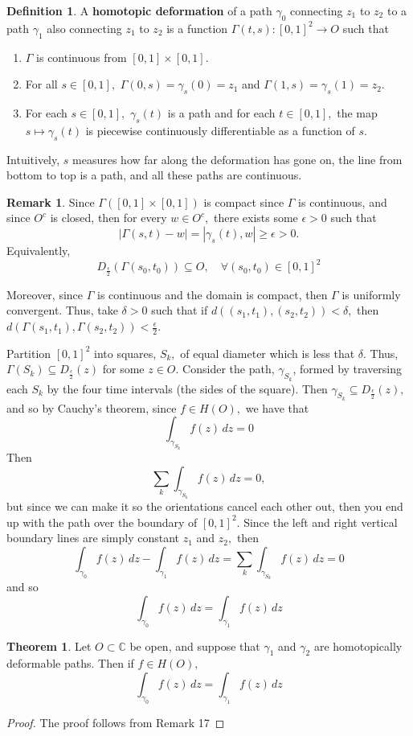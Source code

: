 \documentclass[10pt, oneside]{article}
\newcommand{\bbC}{\mathbb{C}}
\theoremstyle{definition}
\newtheorem{thm}{Theorem}
\newtheorem{defn}{Definition}
\newtheorem{rem}{Remark}
\begin{document}
\begin{defn}
    A \textbf{homotopic deformation} of a path $\gamma_0$ connecting $z_1$ to $z_2$ to a path $\gamma_1$ also connecting $z_1$ to $z_2$ is a function $\Gamma(t,s): [0,1]^2 \to O$ such that     \begin{enumerate}
        \item $\Gamma$ is continuous from $[0,1]\times [0,1].$
        \item For all $s\in [0,1],$ $\Gamma(0,s) = \gamma_s(0) = z_1$ and $\Gamma(1,s) = \gamma_s(1) = z_2.$
        \item For each $s\in [0,1],$ $\gamma_s(t)$ is a path and for each $t\in [0,1],$ the map $s\mapsto \gamma_s(t)$ is piecewise continuously differentiable as a function of $s.$
    \end{enumerate}
\end{defn}
Intuitively, $s$ measures how far along the deformation has gone on, the line from bottom to top is a path, and all these paths are continuous. 
\begin{rem}
    Since $\Gamma([0,1]\times [0,1])$ is compact since $\Gamma$ is continuous, and since $O^c$ is closed, then for every $w\in O^c,$ there exists some $\epsilon>0$ such that 
    \[|\Gamma(s,t) - w| = |\gamma_s(t), w| \geq \epsilon >0.\]
    Equivalently, 
    \[D_{\frac{\epsilon}{2}}(\Gamma(s_0, t_0)) \subseteq O, \quad \forall (s_0, t_0) \in [0,1]^2\]

    Moreover, since $\Gamma$ is continuous and the domain is compact, then $\Gamma$ is uniformly convergent. Thus, take $\delta>0$ such that if $d((s_1, t_1), (s_2, t_2))< \delta,$ then $d(\Gamma(s_1, t_1), \Gamma(s_2, t_2)) < \frac{\epsilon}{2}.$ 

    Partition $[0,1]^2$ into squares, $S_k,$ of equal diameter which is less that $\delta.$ Thus, $\Gamma(S_k)\subseteq D_{\frac{\epsilon}{2}}(z)$ for some $z \in O.$ Consider the path, $\gamma_{S_k}$,  formed by traversing each $S_k$  by the four time intervals (the sides of the square). Then $\gamma_{S_k}\subseteq D_{\frac{\epsilon}{2}}(z),$ and so by Cauchy's theorem, since $f\in H(O),$ we have that 
    \[\int_{\gamma_{S_k}}f(z)\, dz = 0\] Then 
    \[\sum_k \int_{\gamma_{S_k}}f(z)\, dz = 0,\] but since we can make it so the orientations cancel each other out, then you end up with the path over the boundary of $[0,1]^2.$ Since the left and right vertical boundary lines are simply constant $z_1$ and $z_2,$ then
    \[ \int_{\gamma_0}f(z)\, dz - \int_{\gamma_1} f(z)\, dz= \sum_k \int_{\gamma_{S_k}}f(z)\, dz = 0\] and so
    \[\int_{\gamma_0} f(z)\, dz = \int_{\gamma_1} f(z)\,dz\]
\end{rem}
\begin{thm}
    Let $O\subset \bbC$ be open, and suppose that $\gamma_1$ and $\gamma_2$ are homotopically deformable paths. Then if $f\in H(O),$ 
    \[\int_{\gamma_0} f(z)\, dz = \int_{\gamma_1} f(z)\,dz\]
\end{thm}
\begin{proof}
    The proof follows from Remark 17
\end{proof}
\end{document}
